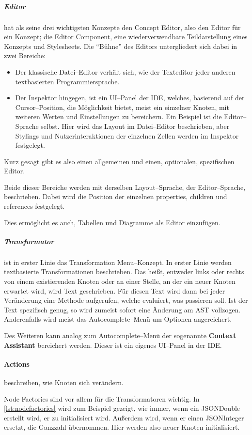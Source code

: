 \subparagraph{Editor} hat als seine drei wichtigsten Konzepte den {\ttfamily Concept Editor}, also den Editor für ein Konzept; die {\ttfamily Editor Component}, eine wiederverwendbare Teildarstellung eines Konzepts und Stylesheets.
Die \enquote{Bühne} des Editors untergliedert sich dabei in zwei Bereiche:
\begin{itemize}
    \item Der klassische Datei--Editor verhält sich, wie der Texteditor jeder anderen textbasierten Programmiersprache.
    \item Der Inspektor hingegen, ist ein \ac{UI}--Panel der \ac{IDE}, welches, basierend auf der Cursor--Position, die Möglichkeit bietet, meist ein einzelner Knoten, mit weiteren Werten und Einstellungen zu bereichern.
    Ein Beispiel ist die Editor--Sprache selbst.
    Hier wird das Layout im Datei--Editor beschrieben, aber Stylings und Nutzerinteraktionen der einzelnen Zellen werden im Inspektor festgelegt.
\end{itemize}
Kurz gesagt gibt es also einen allgemeinen und einen, optionalen, spezifischen Editor.

Beide dieser Bereiche werden mit derselben Layout--Sprache, der Editor--Sprache, beschrieben.
Dabei wird die Position der einzelnen {\ttfamily properties}, {\ttfamily children} und {\ttfamily references} festgelegt.

Dies ermöglicht es auch, Tabellen und Diagramme als Editor einzufügen.

\subparagraph{Transformator} ist in erster Linie das {\ttfamily Transformation Menu}--Konzept.
In erster Linie werden textbasierte Transformationen beschrieben.
Das heißt, entweder links oder rechts von einem existierenden Knoten oder an einer Stelle, an der ein neuer Knoten erwartet wird, wird Text geschrieben.
Für diesen Text wird dann bei jeder Veränderung eine Methode aufgerufen, welche evaluiert, was passieren soll.
Ist der Text spezifisch genug, so wird zumeist sofort eine Änderung am \ac{AST} vollzogen.
Anderenfalls wird meist das Autocomplete--Menü um Optionen angereichert.

Des Weiteren kann analog zum Autocomplete--Menü der sogenannte \textbf{Context Assistant} bereichert werden.
Dieser ist ein eigenes \acs{UI}--Panel in der \ac{IDE}.

\paragraph{Actions} beschreiben, wie Knoten sich verändern.

{\ttfamily Node Factories} sind vor allem für die Transformatoren wichtig.
In \autoref{lst:nodefactories} wird zum Beispiel gezeigt, wie immer, wenn ein {\ttfamily JSONDouble} erstellt wird, er zu {} initialisiert wird.
Außerdem wird, wenn er einen {\ttfamily JSONInteger} ersetzt, die Ganzzahl übernommen.
Hier werden also neuer Knoten initialisiert.

